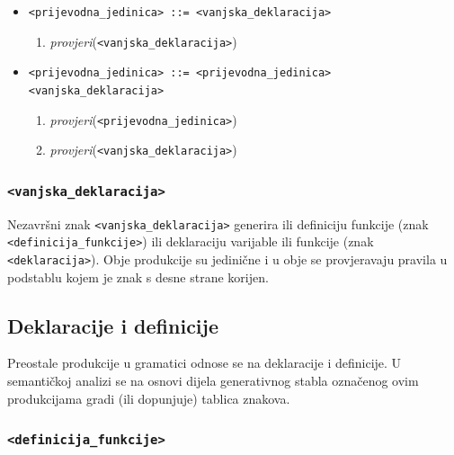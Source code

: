 \documentclass[times, 12pt, utf8]{book}
\begin{document}
\begin{itemize}

\item
\verb|<prijevodna_jedinica> ::= <vanjska_deklaracija>|
\begin{enumerate}
\item
\emph{provjeri}(\verb|<vanjska_deklaracija>|)
\end{enumerate}

\item
\verb|<prijevodna_jedinica> ::= <prijevodna_jedinica> <vanjska_deklaracija>|
\begin{enumerate}
\item
\emph{provjeri}(\verb|<prijevodna_jedinica>|)
\item
\emph{provjeri}(\verb|<vanjska_deklaracija>|)
\end{enumerate}

\end{itemize}

\subsubsection{\texttt{<vanjska\_deklaracija>}}

Nezavršni znak \verb|<vanjska_deklaracija>| generira ili definiciju funkcije (znak \verb|<definicija_funkcije>|) ili deklaraciju varijable ili funkcije (znak \verb|<deklaracija>|).
Obje produkcije su jedinične i u obje se provjeravaju pravila u podstablu kojem je znak s desne strane korijen.


\subsection{Deklaracije i definicije}
Preostale produkcije u gramatici odnose se na deklaracije i definicije.
U semantičkoj analizi se na osnovi dijela generativnog stabla označenog ovim produkcijama gradi (ili dopunjuje) tablica znakova.

\subsubsection{\texttt{<definicija\_funkcije>}}
\end{document}
